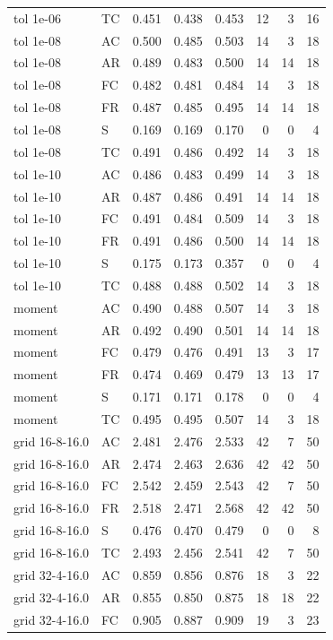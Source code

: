 \documentclass[ecta,nameyear,draft]{econsocart}
\theoremstyle{definition}
\theoremstyle{remark}
\begin{document}
\begin{longtable}{llrrrrrr}
tol 1e-06 & TC & 0.451 & 0.438 & 0.453 & 12 & 3 & 16\\
tol 1e-08 & AC & 0.500 & 0.485 & 0.503 & 14 & 3 & 18\\
tol 1e-08 & AR & 0.489 & 0.483 & 0.500 & 14 & 14 & 18\\
tol 1e-08 & FC & 0.482 & 0.481 & 0.484 & 14 & 3 & 18\\
tol 1e-08 & FR & 0.487 & 0.485 & 0.495 & 14 & 14 & 18\\
tol 1e-08 & S & 0.169 & 0.169 & 0.170 & 0 & 0 & 4\\
tol 1e-08 & TC & 0.491 & 0.486 & 0.492 & 14 & 3 & 18\\
tol 1e-10 & AC & 0.486 & 0.483 & 0.499 & 14 & 3 & 18\\
tol 1e-10 & AR & 0.487 & 0.486 & 0.491 & 14 & 14 & 18\\
tol 1e-10 & FC & 0.491 & 0.484 & 0.509 & 14 & 3 & 18\\
tol 1e-10 & FR & 0.491 & 0.486 & 0.500 & 14 & 14 & 18\\
tol 1e-10 & S & 0.175 & 0.173 & 0.357 & 0 & 0 & 4\\
tol 1e-10 & TC & 0.488 & 0.488 & 0.502 & 14 & 3 & 18\\
moment & AC & 0.490 & 0.488 & 0.507 & 14 & 3 & 18\\
moment & AR & 0.492 & 0.490 & 0.501 & 14 & 14 & 18\\
moment & FC & 0.479 & 0.476 & 0.491 & 13 & 3 & 17\\
moment & FR & 0.474 & 0.469 & 0.479 & 13 & 13 & 17\\
moment & S & 0.171 & 0.171 & 0.178 & 0 & 0 & 4\\
moment & TC & 0.495 & 0.495 & 0.507 & 14 & 3 & 18\\
grid 16-8-16.0 & AC & 2.481 & 2.476 & 2.533 & 42 & 7 & 50\\
grid 16-8-16.0 & AR & 2.474 & 2.463 & 2.636 & 42 & 42 & 50\\
grid 16-8-16.0 & FC & 2.542 & 2.459 & 2.543 & 42 & 7 & 50\\
grid 16-8-16.0 & FR & 2.518 & 2.471 & 2.568 & 42 & 42 & 50\\
grid 16-8-16.0 & S & 0.476 & 0.470 & 0.479 & 0 & 0 & 8\\
grid 16-8-16.0 & TC & 2.493 & 2.456 & 2.541 & 42 & 7 & 50\\
grid 32-4-16.0 & AC & 0.859 & 0.856 & 0.876 & 18 & 3 & 22\\
grid 32-4-16.0 & AR & 0.855 & 0.850 & 0.875 & 18 & 18 & 22\\
grid 32-4-16.0 & FC & 0.905 & 0.887 & 0.909 & 19 & 3 & 23\\

\end{longtable}
\end{document}
